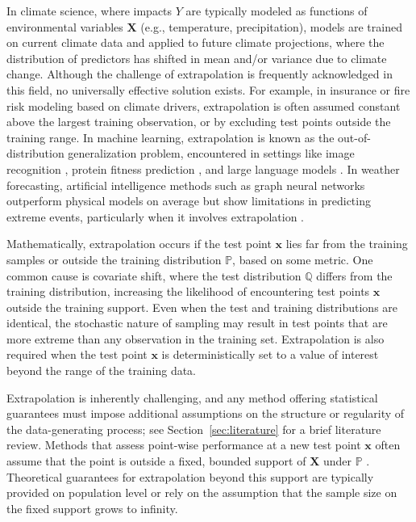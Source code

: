 \documentclass{statsoc}
\theoremstyle{break}
\def\g{\mathbf}
\newcommand{\Ptr}{\mathbb P}
\newcommand{\Pte}{\mathbb Q}
\begin{document}
In climate science, where impacts $Y$ are typically modeled as functions of environmental variables $\g X$ (e.g., temperature, precipitation), models are trained on current climate data
and applied to future climate projections, where the distribution of predictors has shifted in mean and/or variance due to climate change. 
Although the challenge of extrapolation is frequently acknowledged in this field, no universally effective solution exists. For example, in insurance \citep{pim2021} or fire risk modeling \citep{hei2023} based on climate drivers, extrapolation is often assumed constant above the largest training observation, or by excluding test points outside the training range.
In machine learning, extrapolation is known as the out-of-distribution generalization problem, encountered in settings like image recognition \citep{gan2016}, protein fitness prediction \citep{fre2024}, and large language models \citep{graphcast}.
In weather forecasting, artificial intelligence methods such as graph neural networks \citep{graphcast} outperform physical models on average but show limitations in predicting extreme events, particularly when it involves extrapolation \citep{pasche2024}.

Mathematically, extrapolation occurs if the test point $\g x$ lies far from the training samples or outside the training distribution $\Ptr$, based on some metric.
One common cause is covariate shift, where the test distribution $\Pte$ differs from the training distribution, increasing the likelihood of encountering test points $\g x$ outside the training support.
Even when the test and training distributions are identical, the stochastic nature of sampling may result in test points that are more extreme than any observation in the training set. Extrapolation is also required when the test point $\g x$ is deterministically set to a value of interest beyond the range of the training data.
 


Extrapolation is inherently challenging, and any method offering statistical guarantees must impose additional assumptions on the structure or regularity of the data-generating process; see Section~\ref{sec:literature} for a brief literature review. Methods that assess point-wise performance at a new test point $\g x$ often assume that the point is outside a fixed, bounded support of $\g X$ under $\Ptr$ \citep{shen:meinshausen:2023,pfister:buhlman:2023}. Theoretical guarantees for extrapolation beyond this support are typically provided on population level or rely on the assumption that the sample size on the fixed support grows to infinity. 
\end{document}
